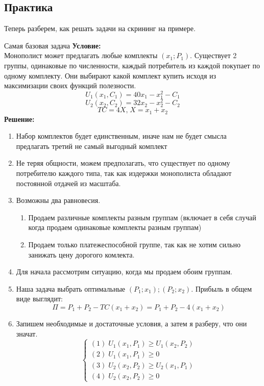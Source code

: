 \subsection{Практика}
Теперь разберем, как решать задачи на скрининг на примере.
\begin{mybox}{Самая базовая задача}
\textbf{Условие:}\\ Монополист может предлагать любые комплекты $(x_1;P_1)$. Существует 2 группы, одинаковые по численности, каждый потребитель из каждой покупает по одному комплекту. Они выбирают какой комплект купить исходя из максимизации своих функций полезности. \\
$$U_1(x_1,C_1)=40x_1-x_1^2-C_1$$
$$U_2(x_2,C_2)=32x_2-x_2^2-C_2$$
$$TC=4X\text{,}\;X=x_1+x_2$$
\tcblower
\textbf{Решение:}
\begin{enumerate}
    \item Набор комплектов будет единственным, иначе нам не будет смысла предлагать третий не самый выгодный комплект
    \item Не теряя общности, можем предполагать, что существует по одному потребителю каждого типа, так как издержки монополиста обладают постоянной отдачей из масштаба.
    \item Возможны два равновесия. \begin{enumerate}
        \item Продаем различные комплекты разным группам (включает в себя случай когда продаем одинаковые комплекты
        разным группам)
        \item Продаем только платежеспособной группе, так как не хотим сильно занижать цену дорогого комлекта.
    \end{enumerate}
    \item Для начала рассмотрим ситуацию, когда мы продаем обоим группам.
    \item Наша задача выбрать оптимальные $(P_1;x_1);(P_2;x_2)$. Прибыль в общем виде выглядит: $$\Pi=P_1+P_2-TC(x_1+x_2)=P_1+P_2-4(x_1+x_2)$$
    \item Запишем необходимые и достаточные условия, а затем я разберу, что они значат.
    \begin{equation*}
     \begin{cases}
       (1)\;U_1(x_1,P_1)\geq U_1(x_2,P_2)
       \\
       (2)\;U_1(x_1,P_1)\geq 0
       \\
       (3)\;U_2(x_2,P_2)\geq U_2(x_1,P_1)
       \\
       (4)\;U_2(x_2,P_2)\geq 0
     \end{cases}

\end{equation*}
\end{enumerate}
\end{mybox}
